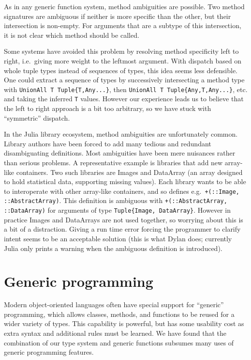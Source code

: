 As in any generic function system, method ambiguities are possible.
Two method signatures are ambiguous if neither is more specific than
the other, but their intersection is non-empty.
For arguments that are a subtype of this intersection, it is not
clear which method should be called.

Some systems have avoided this problem by resolving method
specificity left to right, i.e.\ giving more weight to the leftmost
argument.
With dispatch based on whole tuple types instead of sequences of
types, this idea seems less defensible.
One could extract a sequence of types by successively
intersecting a method type with \texttt{UnionAll T Tuple\{T,Any...\}},
then \texttt{UnionAll T Tuple\{Any,T,Any...\}}, etc. and taking the
inferred \texttt{T} values.
However our experience leads us to believe that the left to right
approach is a bit too arbitrary, so we have stuck with ``symmetric''
dispatch.

In the Julia library ecosystem, method ambiguities are unfortunately
common.
Library authors have been forced to add many tedious and redundant
disambiguating definitions.
Most ambiguities have been mere nuisances rather than serious
problems.
A representative example is libraries that add new array-like
containers.
Two such libraries are Images and DataArray (an array designed to
hold statistical data, supporting missing values).
Each library wants to be able to interoperate with other array-like
containers, and so defines e.g.\ \texttt{+(::Image, ::AbstractArray)}.
This definition is ambiguous with \texttt{+(::AbstractArray, ::DataArray)}
for arguments of type \texttt{Tuple\{Image, DataArray\}}.
However in practice Images and DataArrays are not used together, so
worrying about this is a bit of a distraction.
Giving a run time error forcing the programmer to clarify intent
seems to be an acceptable solution (this is what Dylan does;
currently Julia only prints a warning when the ambiguous definition
is introduced).

\section{Generic programming}

Modern object-oriented languages often have special support for ``generic''
programming, which allows classes, methods, and functions to be reused
for a wider variety of types.
This capability is powerful, but has some usability cost as extra
syntax and additional rules must be learned.
We have found that the combination of our type system and generic functions
subsumes many uses of generic programming features.

